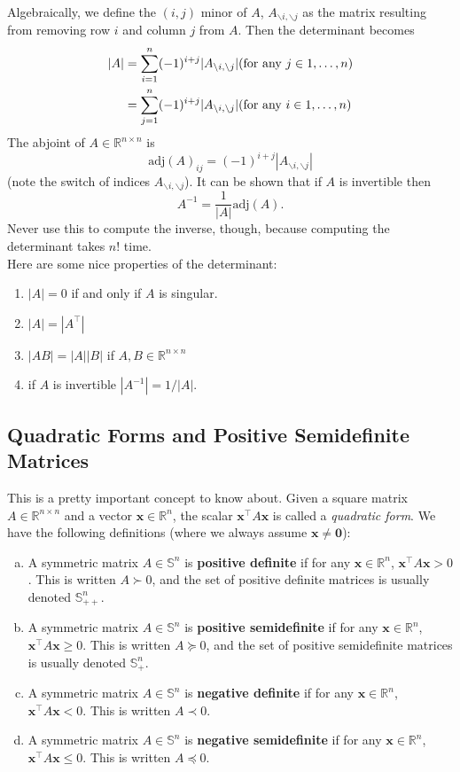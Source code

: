 \documentclass{article}
\newcommand{\1}{\mathbf{1}}
\newcommand{\0}{\mathbf{0}}
\newcommand{\xx}{\mathbf{x}}
\newcommand{\RR}{\mathbb{R}}
\renewcommand{\SS}{\mathbb{S}}
\newcommand{\T}{\top}
\begin{document}
Algebraically, we define the $(i,j)$ minor of $A$, $A_{\backslash i, \backslash j}$
as the matrix resulting from removing row $i$ and column $j$ from $A$. Then the
determinant becomes
\begin{align*}
    |A| &= \sum_{i=1}^n (-1)^{i+j}|A_{\backslash i,\backslash j}| \hfill \text{(for any $j\in 1,\dots,n$)}\\
        &= \sum_{j=1}^n (-1)^{i+j}|A_{\backslash i,\backslash j}| \hfill \text{(for any $i\in 1,\dots,n$)}\\
\end{align*}
The abjoint of $A\in\RR^{n\times n}$ is
\[
    \mathrm{adj}(A)_{ij} = (-1)^{i+j}|A_{\backslash i,\backslash j}|
\]
(note the switch of indices $A_{\backslash i,\backslash j}$). It can be shown that if $A$ is invertible
then
\[
    A^{-1} = \frac{1}{|A|}\mathrm{adj}(A).
\]
Never use this to compute the inverse, though, because computing the determinant takes
$n!$ time.\\

Here are some nice properties of the determinant:
\begin{enumerate}
    \item $|A|=0$ if and only if $A$ is singular.
    \item $|A|=|A^\T|$
    \item $|AB|=|A||B|$ if $A,B\in\RR^{n\times n}$
    \item if $A$ is invertible $|A^{-1}| = 1/|A|$.
\end{enumerate}

\subsection{Quadratic Forms and Positive Semidefinite Matrices}

This is a pretty important concept to know about. Given a square matrix $A\in\RR^{n\times n}$
and a vector $\xx\in\RR^n$, the scalar $\xx^\T A\xx$ is called a
\textit{quadratic form}. We have the following definitions (where we
always assume $\xx \neq \0$):
\begin{enumerate}[(a)]
    \item A symmetric matrix $A\in\SS^n$ is \textbf{positive definite}
        if for any $\xx\in\RR^n$, $\xx^\T A\xx > 0$. This is written
        $A \succ 0$, and the set of positive definite matrices is
        usually denoted $\SS_{++}^n$.
    \item A symmetric matrix $A\in\SS^n$ is \textbf{positive semidefinite}
        if for any $\xx\in\RR^n$, $\xx^\T A\xx \geq 0$. This is written
        $A \succeq 0$, and the set of positive semidefinite matrices is
        usually denoted $\SS_{+}^n$.
    \item A symmetric matrix $A\in\SS^n$ is \textbf{negative definite}
        if for any $\xx\in\RR^n$, $\xx^\T A\xx < 0$. This is written
        $A \prec 0$.
    \item A symmetric matrix $A\in\SS^n$ is \textbf{negative semidefinite}
        if for any $\xx\in\RR^n$, $\xx^\T A\xx \leq 0$. This is written
        $A \preceq 0$.
\end{enumerate}
\end{document}
